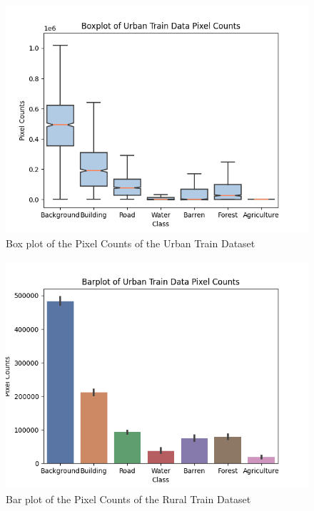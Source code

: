 \begin{figure}[!h]
\includegraphics[width=15.0cm, height=8.5cm]{images/urban train boxplot.png}
\centering
\caption{Box plot of the Pixel Counts of the Urban Train Dataset}
\label{fig:boxplot-urban-train}
\end{figure}

\begin{figure}[!h]
\includegraphics[width=15.0cm, height=8.5cm]{images/urban train barplot.png}
\centering
\caption{Bar plot of the Pixel Counts of the Rural Train Dataset}
\label{fig:barplot-urban-train}
\end{figure}



